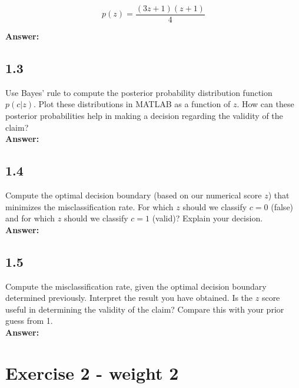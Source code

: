 \documentclass[a4paper]{article}
\begin{document}
\begin{equation}
	p(z) = \frac{(3z + 1)(z + 1)}{4}
\end{equation}


\textbf{Answer:}\\




\subsection*{1.3}

Use Bayes' rule to compute the posterior probability distribution function $p(c|z)$. Plot these distributions in MATLAB as a function of $z$. How can these posterior probabilities help in making a decision regarding the validity of the claim?\\


\textbf{Answer:}\\



\subsection*{1.4}

Compute the optimal decision boundary (based on our numerical score $z$) that minimizes the misclassification rate. For which $z$ should we classify $c = 0$ (false) and for which $z$ should we classify $c = 1$ (valid)? Explain your decision.\\


\textbf{Answer:}\\



\subsection*{1.5}

Compute the misclassification rate, given the optimal decision boundary determined previously. Interpret the result you have obtained. Is the $z$ score useful in determining the validity of the claim? Compare this with your prior guess from 1.\\


\textbf{Answer:}\\




\section*{Exercise 2 - weight 2}
\end{document}
